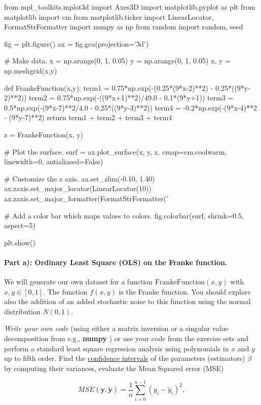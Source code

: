 \documentclass[%
oneside,                 %
final,                   %
10pt]{article}
\begin{document}
\bpycod
from mpl_toolkits.mplot3d import Axes3D
import matplotlib.pyplot as plt
from matplotlib import cm
from matplotlib.ticker import LinearLocator, FormatStrFormatter
import numpy as np
from random import random, seed

fig = plt.figure()
ax = fig.gca(projection='3d')

# Make data.
x = np.arange(0, 1, 0.05)
y = np.arange(0, 1, 0.05)
x, y = np.meshgrid(x,y)


def FrankeFunction(x,y):
    term1 = 0.75*np.exp(-(0.25*(9*x-2)**2) - 0.25*((9*y-2)**2))
    term2 = 0.75*np.exp(-((9*x+1)**2)/49.0 - 0.1*(9*y+1))
    term3 = 0.5*np.exp(-(9*x-7)**2/4.0 - 0.25*((9*y-3)**2))
    term4 = -0.2*np.exp(-(9*x-4)**2 - (9*y-7)**2)
    return term1 + term2 + term3 + term4


z = FrankeFunction(x, y)

# Plot the surface.
surf = ax.plot_surface(x, y, z, cmap=cm.coolwarm,
                       linewidth=0, antialiased=False)

# Customize the z axis.
ax.set_zlim(-0.10, 1.40)
ax.zaxis.set_major_locator(LinearLocator(10))
ax.zaxis.set_major_formatter(FormatStrFormatter('%

# Add a color bar which maps values to colors.
fig.colorbar(surf, shrink=0.5, aspect=5)

plt.show()


\epycod


\paragraph{Part a): Ordinary Least Square (OLS) on the Franke function.}
We will generate our own dataset for a function
$\mathrm{FrankeFunction}(x,y)$ with $x,y \in [0,1]$. The function
$f(x,y)$ is the Franke function. You should explore also the addition
of an added stochastic noise to this function using the normal
distribution $N(0,1)$.

\emph{Write your own code} (using either a matrix inversion or a singular
value decomposition from e.g., \textbf{numpy} ) or use your code from
the exercise sets  and perform a standard least square regression
analysis using polynomials in $x$ and $y$ up to fifth order. Find the
\href{{https://en.wikipedia.org/wiki/Confidence_interval}}{confidence intervals} of the parameters (estimators) $\beta$ by computing their
variances, evaluate the Mean Squared error (MSE)

\[ MSE(\bm{y},\bm{\tilde{y}}) = \frac{1}{n}
\sum_{i=0}^{n-1}(y_i-\tilde{y}_i)^2, 
\] 
\end{document}
